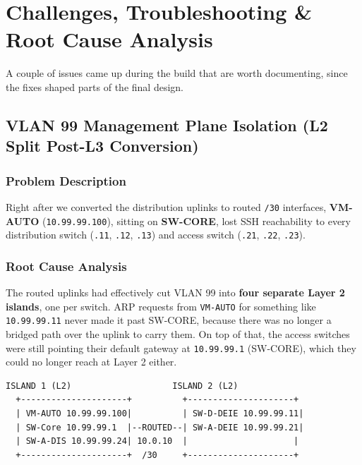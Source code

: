 \documentclass[11pt,a4paper]{article}
\newcommand{\hr}{\vspace{0.2cm}\noindent\hrulefill\vspace{0.2cm}}
\begin{document}
\hr

\section{Challenges, Troubleshooting \& Root Cause Analysis}

A couple of issues came up during the build that are worth documenting, since the fixes shaped parts of the final design.

\subsection{VLAN 99 Management Plane Isolation (L2 Split Post-L3 Conversion)}

\subsubsection{Problem Description}
Right after we converted the distribution uplinks to routed \texttt{/30} interfaces, \textbf{VM-AUTO} (\texttt{10.99.99.100}), sitting on \textbf{SW-CORE}, lost SSH reachability to every distribution switch (\texttt{.11}, \texttt{.12}, \texttt{.13}) and access switch (\texttt{.21}, \texttt{.22}, \texttt{.23}).

\subsubsection{Root Cause Analysis}
The routed uplinks had effectively cut VLAN 99 into \textbf{four separate Layer 2 islands}, one per switch. ARP requests from \texttt{VM-AUTO} for something like \texttt{10.99.99.11} never made it past SW-CORE, because there was no longer a bridged path over the uplink to carry them. On top of that, the access switches were still pointing their default gateway at \texttt{10.99.99.1} (SW-CORE), which they could no longer reach at Layer 2 either.

\begin{lstlisting}[style=console, caption={VLAN 99 Layer 2 Segmentation Diagram}]
       ISLAND 1 (L2)                    ISLAND 2 (L2)
  +---------------------+          +---------------------+
  | VM-AUTO 10.99.99.100|          | SW-D-DEIE 10.99.99.11|
  | SW-Core 10.99.99.1  |--ROUTED--| SW-A-DEIE 10.99.99.21|
  | SW-A-DIS 10.99.99.24| 10.0.10  |                     |
  +---------------------+  /30     +---------------------+
\end{lstlisting}
\end{document}
